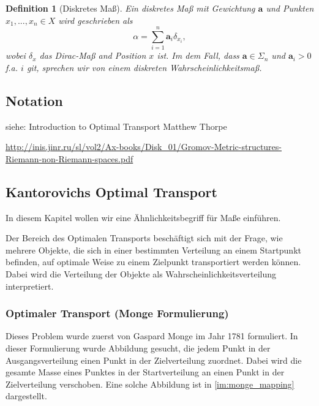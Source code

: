\documentclass[11pt,a4paper]{article}
\newtheorem{definition}[theorem]{Definition}
\numberwithin{equation}{section}
\begin{document}
	\begin{definition}[Diskretes Maß]
		Ein diskretes Maß mit Gewichtung $\boldsymbol{a}$ und Punkten $x_1,...,x_n \in X$ wird geschrieben als
		\begin{equation}
		\alpha = \sum_{i=1}^n{\boldsymbol{a}_i\delta_{x_i}},
		\end{equation}
		wobei $\delta_x$ das Dirac-Maß and Position $x$ ist. Im dem Fall, dass $\boldsymbol{a} \in \Sigma_n$ und $\boldsymbol{a}_i >0$ f.a. $i$ git, sprechen wir von einem diskreten Wahrscheinlichkeitsmaß.
	\end{definition}
	\subsection{Notation}
	siehe: Introduction to Optimal Transport
	Matthew Thorpe
	
	\url{http://inis.jinr.ru/sl/vol2/Ax-books/Disk_01/Gromov-Metric-structures-Riemann-non-Riemann-spaces.pdf}
	\subsection{Kantorovichs Optimal Transport}
	In diesem Kapitel wollen wir eine Ähnlichkeitsbegriff für Maße einführen.
	
	Der Bereich des Optimalen Transports beschäftigt sich mit der Frage, wie mehrere Objekte, die sich in einer bestimmten Verteilung an einem Startpunkt befinden, auf optimale Weise zu einem Zielpunkt transportiert werden können. Dabei wird die Verteilung der Objekte als Wahrscheinlichkeitsverteilung interpretiert. 
	
	
	\subsubsection{Optimaler Transport (Monge Formulierung)}
	
	Dieses Problem wurde zuerst von Gaspard Monge im Jahr 1781 formuliert. In dieser Formulierung wurde Abbildung gesucht, die jedem Punkt in der Ausgangsverteilung einen Punkt in der Zielverteilung zuordnet. Dabei wird die gesamte Masse eines Punktes in der Startverteilung an einen Punkt in der Zielverteilung verschoben. Eine solche Abbildung ist in \autoref{im:monge_mapping} dargestellt.
	
\end{document}
